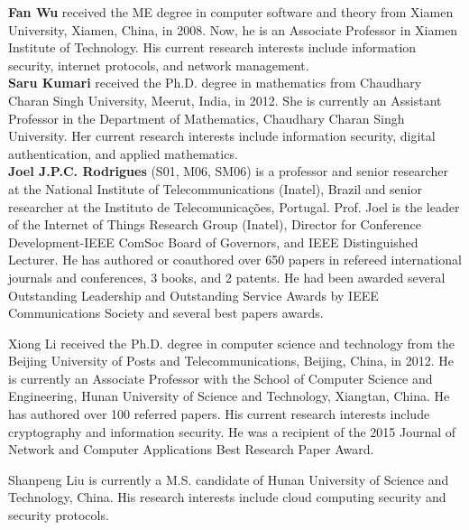 \documentclass[IEEE JOURNAL OF BIOMEDICAL AND HEALTH INFORMATICS]{IEEEtran}
\begin{document}
{\noindent\textbf{Fan Wu} received the ME degree in computer software and theory from Xiamen University, Xiamen, China, in 2008. Now, he is an Associate Professor in Xiamen Institute of Technology. His current research interests include information security, internet protocols, and network management.\\

\noindent\textbf{Saru Kumari} received the Ph.D. degree in mathematics from Chaudhary Charan Singh University, Meerut, India, in 2012. She is currently an Assistant Professor in the
Department of Mathematics, Chaudhary Charan Singh University. Her current research interests include information security, digital authentication, and applied mathematics.\\

\noindent\textbf{Joel J.P.C. Rodrigues} (S01, M06, SM06) is a professor and senior researcher at the National Institute of Telecommunications (Inatel), Brazil and senior researcher at the Instituto de Telecomunica\c{c}\~oes, Portugal. Prof. Joel is the leader of the Internet of Things Research Group (Inatel), Director for Conference Development-IEEE ComSoc Board of Governors, and IEEE Distinguished Lecturer. He has authored or coauthored over 650 papers in refereed international journals and conferences, 3 books, and 2 patents. He had been awarded several Outstanding Leadership and Outstanding Service Awards by IEEE Communications Society and several best papers awards.




\vspace{-1cm}
\begin{IEEEbiography}{Xiong Li}
received the Ph.D. degree in computer science and technology from the Beijing University of Posts and Telecommunications, Beijing, China, in 2012. He is currently an Associate Professor with the School of Computer Science and Engineering, Hunan University of Science and Technology, Xiangtan, China. He has authored over 100 referred papers. His current research interests include cryptography and information security. He was a recipient of the 2015 Journal of Network and Computer Applications Best Research Paper Award.
\end{IEEEbiography}

\vspace{-1.5cm}
\begin{IEEEbiography}{Shanpeng Liu}
 is currently a M.S. candidate of Hunan University of Science and Technology, China. His research interests include cloud computing security and security protocols.
\end{IEEEbiography}
\vspace{-1.5cm}

}
\end{document}
